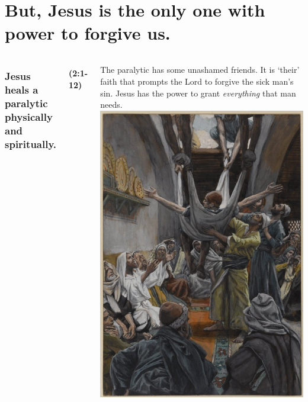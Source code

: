 \documentclass{beamer}
\begin{document}
\section{But, Jesus is the only one with power to forgive us.}
\begin{frame}
\begin{columns}
\column{5cm}
\frametitle{Jesus heals a paralytic physically and spiritually.}
\framesubtitle{(2:1-12)}
The paralytic has some unashamed friends.
It is `their' faith that prompts the Lord to forgive the sick man's sin.
Jesus has the power to grant \emph{everything} that man needs.
\column{5cm}
\includegraphics[width=\textwidth]{graphics/paralytic.jpg}
\end{columns}
\end{frame}
\end{document}
